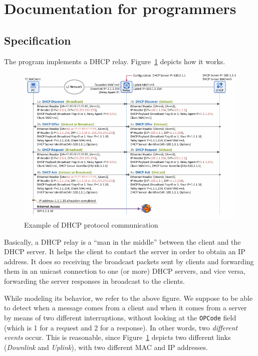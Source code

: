 \section{Documentation for programmers}
\subsection{Specification}
The program implements a DHCP relay. Figure~\ref{fig:dhcp} depicts how it works.
\begin{figure}[h]
	\centering\includegraphics[scale=0.56]{images/dhcp}
	\caption{Example of DHCP protocol communication\protect\footnotemark}
	\label{fig:dhcp}
\end{figure}

Basically, a DHCP relay is a ``man in the middle'' between the client and the DHCP server. It helps the client to contact the server in order to obtain an IP address. It does so receiving the broadcast packets sent by clients and forwarding them in an unicast connection to one (or more) DHCP servers, and vice versa, forwarding the server responses in broadcast to the clients. 

While modeling its behavior, we refer to the above figure. We suppose to be able to detect when a message comes from a client and when it comes from a server by means of two different interruptions, without looking at the \texttt{OPCode} field (which is 1 for a request and 2 for a response). In other words, two \textit{different events} occur. This is reasonable, since Figure~\ref{fig:dhcp} depicts two different links (\textit{Downlink} and \textit{Uplink}), with two different MAC and IP addresses.\\

